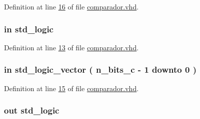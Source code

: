 Definition at line \hyperlink{comparador_8vhd_source_l00016}{16} of file \hyperlink{comparador_8vhd_source}{comparador.\+vhd}.

\hypertarget{classcomparador_a4a4609c199d30b3adebbeb3a01276ec5}{}
\subsubsection[{clk}]{ {\bfseries \textcolor{keywordflow}{in}\textcolor{vhdlchar}{ }} {\bfseries \textcolor{comment}{std\+\_\+logic}\textcolor{vhdlchar}{ }} \hspace{0.3cm}{\ttfamily [Port]}}\label{classcomparador_a4a4609c199d30b3adebbeb3a01276ec5}


Definition at line \hyperlink{comparador_8vhd_source_l00013}{13} of file \hyperlink{comparador_8vhd_source}{comparador.\+vhd}.

\hypertarget{classcomparador_a0c2a0581e706d5256b50516b6ca4dbed}{}
\subsubsection[{comp}]{ {\bfseries \textcolor{keywordflow}{in}\textcolor{vhdlchar}{ }} {\bfseries \textcolor{comment}{std\+\_\+logic\+\_\+vector}\textcolor{vhdlchar}{ }\textcolor{vhdlchar}{(}\textcolor{vhdlchar}{ }\textcolor{vhdlchar}{ }\textcolor{vhdlchar}{ }\textcolor{vhdlchar}{ }{\bfseries {\bf n\+\_\+bits\+\_\+c}} \textcolor{vhdlchar}{-\/}\textcolor{vhdlchar}{ } \textcolor{vhdldigit}{1} \textcolor{vhdlchar}{ }\textcolor{keywordflow}{downto}\textcolor{vhdlchar}{ }\textcolor{vhdlchar}{ } \textcolor{vhdldigit}{0} \textcolor{vhdlchar}{ }\textcolor{vhdlchar}{)}\textcolor{vhdlchar}{ }} \hspace{0.3cm}{\ttfamily [Port]}}\label{classcomparador_a0c2a0581e706d5256b50516b6ca4dbed}


Definition at line \hyperlink{comparador_8vhd_source_l00015}{15} of file \hyperlink{comparador_8vhd_source}{comparador.\+vhd}.

\hypertarget{classcomparador_a2522d63dc2aa0652b3cca6ac9b1da0bd}{}
\subsubsection[{comp\+\_\+out}]{ {\bfseries \textcolor{keywordflow}{out}\textcolor{vhdlchar}{ }} {\bfseries \textcolor{comment}{std\+\_\+logic}\textcolor{vhdlchar}{ }} \hspace{0.3cm}{\ttfamily [Port]}}\label{classcomparador_a2522d63dc2aa0652b3cca6ac9b1da0bd}


